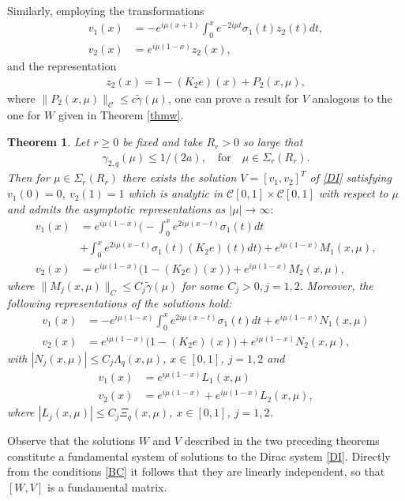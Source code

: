 \documentclass[11pt]{amsart}
\theoremstyle{plain}
\newtheorem{thm}{Theorem}[section]
\theoremstyle{definition}
\theoremstyle{remark}
\numberwithin{equation}{section}
\begin{document}
Similarly, employing the transformations
\begin{align*}
v_1(x)&=-e^{i \mu (x+1)}\int_0^x e^{-2 i \mu t}\sigma_1(t)z_2(t)dt,\\
v_2(x)&= e^{i \mu (1-x)}z_2(x),
\end{align*}
and the representation
\begin{align}
z_2(x)=1-(K_2e)(x)+P_2(x,\mu),
\end{align}
where $\|P_2(x,\mu)\|_\mathcal{C}\leq c \widetilde{\gamma}(\mu)$,
one can prove a result for $V$ analogous to the one for $W$ given in Theorem \ref{thmw}.
\begin{thm}\label{thmv}
Let $r\ge 0$  be fixed and take $R_r>0$ so large that
\begin{align*}
\gamma_{2,q}(\mu)\le 1/(2a),\quad \mbox{for}\quad \mu\in \Sigma_r(R_r).
\end{align*}
Then for $\mu\in \Sigma_r(R_r)$ there exists
the solution $V=[v_1,v_2]^T$ of \eqref{DI} satisfying $v_1(0)=0$, $v_2(1)=1$
which is analytic in $\mathcal{C}[0,1]\times \mathcal{C}[0,1]$  with respect to $\mu$ and
 admits the
asymptotic representations as $|\mu|\to \infty:$
\begin{align}
v_1(x)&=e^{i \mu (1-x)}\Big(-\int_0^x e^{2i \mu (x-t)}\sigma_1(t)dt\label{B1}\\
&+\int_0^xe^{2i \mu (x-t)}\sigma_1(t)(K_2e)(t)dt \Big)+ e^{i \mu (1-x)}M_1(x,\mu),\nonumber\\
v_2(x)&=e^{i \mu(1-x)}\Big(1-(K_2e)(x)\Big)+ e^{i \mu (1-x)}M_2(x,\mu),\nonumber
\end{align}
where
$\|M_j(x,\mu)\|_C \leq C_j \widetilde{\gamma}(\mu)$ for some $C_j>0, j=1,2.$
Moreover, the following representations of the solutions hold:
\begin{align}
v_1(x)&=-e^{i \mu (1-x)}\int_0^x e^{2i \mu (x-t)}\sigma_1(t)dt + e^{i \mu (1-x)}N_1(x,\mu) \label{B2}\\
v_2(x)&=e^{i \mu(1-x)}\Big(1-(K_2e)(x)\Big)+ e^{i \mu (1-x)}N_2(x,\mu), \nonumber
\end{align}
with
$|N_j(x,\mu)| \leq C_j \Lambda_q(x,\mu)$,  $x\in [0,1]$, $j=1,2$
and
\begin{align}
v_1(x)&=e^{i \mu (1-x)}L_1(x,\mu)\label{B3}\\
v_2(x)&=e^{i \mu(1-x)}+ e^{i \mu (1-x)}L_2(x,\mu), \nonumber
\end{align}
where
$|L_j(x,\mu)| \leq C_j \Xi_q(x,\mu)$, $x\in [0,1]$, $j=1,2$.
\end{thm}
Observe that the solutions $W$ and $V$ described in the two preceding theorems constitute a fundamental system of solutions to the
Dirac system \eqref{DI}. Directly from the conditions \eqref{BC} it follows that they are linearly independent, so that $[W,V]$
is a fundamental matrix.
\end{document}
